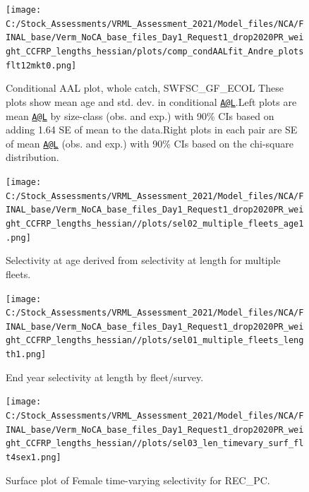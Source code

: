 \documentclass[11pt,
  english,
]{article}
\begin{document}
\begin{figure}
\centering
\texttt{[image: C:/Stock\_Assessments/VRML\_Assessment\_2021/Model\_files/NCA/FINAL\_base/Verm\_NoCA\_base\_files\_Day1\_Request1\_drop2020PR\_weight\_CCFRP\_lengths\_hessian/plots/comp\_condAALfit\_Andre\_plotsflt12mkt0.png]}
\caption{Conditional AAL plot, whole catch, SWFSC\_GF\_ECOL These plots show mean age and std. dev. in conditional {\href{mailto:A@L}{\nolinkurl{A@L}}\leavevmode\tagmcend\tagstructend}.Left plots are mean {\href{mailto:A@L}{\nolinkurl{A@L}}\leavevmode\tagmcend\tagstructend} by size-class (obs. and exp.) with 90\% CIs based on adding 1.64 SE of mean to the data.Right plots in each pair are SE of mean {\href{mailto:A@L}{\nolinkurl{A@L}}\leavevmode\tagmcend\tagstructend} (obs. and exp.) with 90\% CIs based on the chi-square distribution.\label{fig:comp_condAALfit_Andre_plotsflt12mkt0}}
\end{figure}

\clearpage
\FloatBarrier

\FloatBarrier

\begin{figure}
\centering
\texttt{[image: C:/Stock\_Assessments/VRML\_Assessment\_2021/Model\_files/NCA/FINAL\_base/Verm\_NoCA\_base\_files\_Day1\_Request1\_drop2020PR\_weight\_CCFRP\_lengths\_hessian//plots/sel02\_multiple\_fleets\_age1.png]}
\caption{Selectivity at age derived from selectivity at length for multiple fleets.\label{fig:selex-age-all}}
\end{figure}

\FloatBarrier

\begin{figure}
\centering
\texttt{[image: C:/Stock\_Assessments/VRML\_Assessment\_2021/Model\_files/NCA/FINAL\_base/Verm\_NoCA\_base\_files\_Day1\_Request1\_drop2020PR\_weight\_CCFRP\_lengths\_hessian//plots/sel01\_multiple\_fleets\_length1.png]}
\caption{End year selectivity at length by fleet/survey.\label{fig:selex-length-all}}
\end{figure}

\FloatBarrier

\begin{figure}
\centering
\texttt{[image: C:/Stock\_Assessments/VRML\_Assessment\_2021/Model\_files/NCA/FINAL\_base/Verm\_NoCA\_base\_files\_Day1\_Request1\_drop2020PR\_weight\_CCFRP\_lengths\_hessian//plots/sel03\_len\_timevary\_surf\_flt4sex1.png]}
\caption{Surface plot of Female time-varying selectivity for REC\_PC.\label{fig:sel03_len_timevary_surf_flt4sex1}}
\end{figure}
\end{document}
